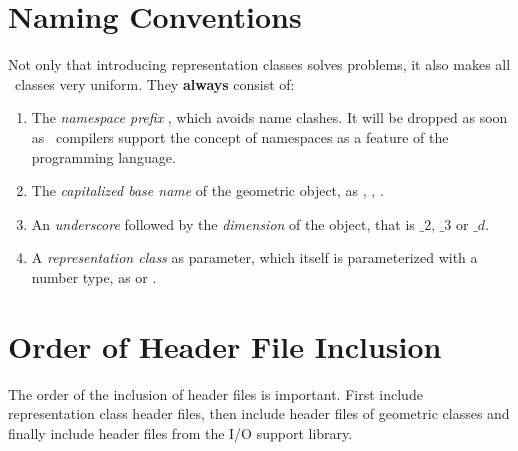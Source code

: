 \section{Naming Conventions}

Not only that introducing representation classes solves problems, it
also makes all \cgal\ classes very uniform. They {\bf always} consist of:
\begin{enumerate}
\item The {\em namespace prefix} , which avoids name 
      clashes. It will be dropped as soon as \CC\ compilers support the 
      concept of namespaces as a feature of the programming language.

\item The {\em capitalized base name} of the geometric object, as 
      , , .

\item An {\em underscore} followed by the {\em dimension} of the object, 
      that is $\_2$, $\_3$ or $\_d$.

\item A  {\em representation class} as parameter, which itself is
      parameterized with a number type, as  
      or .
\end{enumerate}
 
\section{Order of Header File Inclusion}

The order of the inclusion of header files is important. First include
representation class header files, then include header files of geometric
classes and finally include header files from the  I/O support library.

